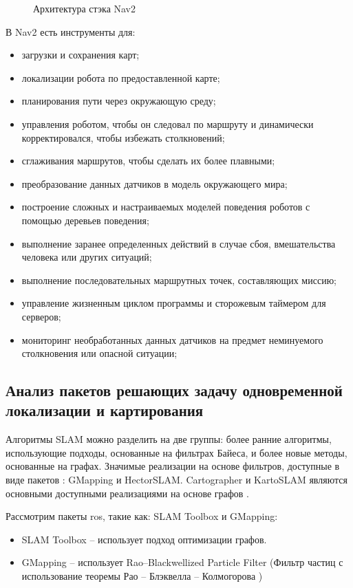 \begin{figure}[h]
\centering
\caption{Архитектура стэка Nav2}
\end{figure}

В Nav2 есть инструменты для:
\begin{itemize}
	\item загрузки и сохранения карт;
	\item локализации робота по предоставленной карте;
	\item планирования пути через окружающую среду;
	\item управления роботом, чтобы он следовал по маршруту и динамически
		корректировался, чтобы избежать столкновений;
	\item сглаживания маршрутов, чтобы сделать их более плавными;
	\item преобразование данных датчиков в модель окружающего мира;
	\item построение сложных и настраиваемых моделей поведения роботов с
		помощью деревьев поведения;
	\item выполнение заранее определенных действий в случае сбоя, вмешательства
		человека или других ситуаций;
	\item выполнение последовательных маршрутных точек, составляющих миссию;
	\item управление жизненным циклом программы и сторожевым таймером для
		серверов;
	\item мониторинг необработанных данных датчиков на предмет неминуемого
		столкновения или опасной ситуации;
\end{itemize}

\subsection{Анализ пакетов \ros{} решающих задачу одновременной локализации и
картирования}
\label{sec:ros_analysys}

Алгоритмы SLAM можно разделить на две группы: более ранние алгоритмы,
использующие подходы, основанные на фильтрах Байеса, и более новые методы,
основанные на графах. Значимые реализации на основе фильтров, доступные в виде
пакетов \ros{}: GMapping и HectorSLAM. Cartographer и KartoSLAM являются
основными доступными реализациями на основе графов \cite{macenski2021slam}.

Рассмотрим пакеты ros{}, такие как: SLAM Toolbox и GMapping:
\begin{itemize}
	\item SLAM Toolbox -- использует подход оптимизации
		графов.
	\item GMapping \cite{grisetti2005improving} -- использует Rao–Blackwellized
		Particle Filter (Фильтр частиц с использование теоремы Рао -- Блэквелла --
		Колмогорова )
\end{itemize}

